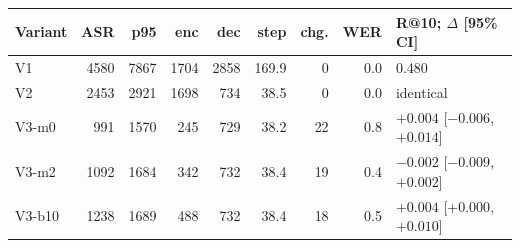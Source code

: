 \begin{tabular}{lrrrrrrrl}
\toprule
Variant & ASR & p95 & enc & dec & step & chg. & WER & R@10; $\Delta$ [95\% CI] \\
\midrule
V1 & 4580 & 7867 & 1704 & 2858 & 169.9 & 0 & 0.0 & 0.480 \\
V2 & 2453 & 2921 & 1698 & 734 & 38.5 & 0 & 0.0 & identical \\
V3-m0 & 991 & 1570 & 245 & 729 & 38.2 & 22 & 0.8 & $+0.004$ [$-0.006$, $+0.014$] \\
V3-m2 & 1092 & 1684 & 342 & 732 & 38.4 & 19 & 0.4 & $-0.002$ [$-0.009$, $+0.002$] \\
V3-b10 & 1238 & 1689 & 488 & 732 & 38.4 & 18 & 0.5 & $+0.004$ [$+0.000$, $+0.010$] \\
\bottomrule
\end{tabular}
